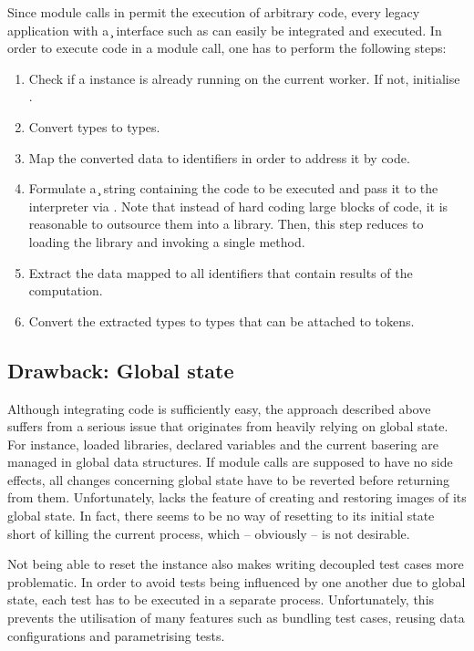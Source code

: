 Since module calls in \gpispace{} permit the execution of arbitrary \cplusplus{} code, every legacy application with a \c{} interface such as \singular{} can easily be integrated and executed. In order to execute \singular{} code in a module call, one has to perform the following steps:
\begin{enumerate}
	\item Check if a \singular{} instance is already running on the current worker. If not, initialise \singular{}.
	\item Convert \gpispace{} types to \singular{} types.
	\item Map the converted data to identifiers in order to address it by \singular{} code.
	\item Formulate a \c{} string containing the \singular{} code to be executed and pass it to the \singular{} interpreter via \libsingular{}. Note that instead of hard coding large blocks of code, it is reasonable to outsource them into a \singular{} library. Then, this step reduces to loading the library and invoking a single method.
	\item Extract the data mapped to all identifiers that contain results of the computation.
	\item Convert the extracted \singular{} types to \gpispace{} types that can be attached to tokens.
\end{enumerate}

\subsection*{Drawback: Global state}
Although integrating \singular{} code is sufficiently easy, the approach described above suffers from a serious issue that originates from \singular{} heavily relying on global state. For instance, loaded libraries, declared variables and the current basering are managed in global data structures. If module calls are supposed to have no side effects, all changes concerning global state have to be reverted before returning from them. Unfortunately, \libsingular{} lacks the feature of creating and restoring images of its global state. In fact, there seems to be no way of resetting \singular{} to its initial state short of killing the current process, which -- obviously -- is not desirable.

Not being able to reset the \singular{} instance also makes writing decoupled test cases more problematic. In order to avoid tests being influenced by one another due to global \singular{} state, each test has to be executed in a separate process. Unfortunately, this prevents the utilisation of many \gtest{} features such as bundling test cases, reusing data configurations and parametrising tests.

